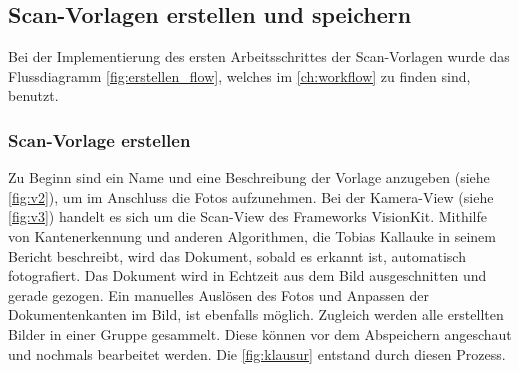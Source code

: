 \documentclass[notables, nomenclature, oneside, 150]{HSMW-Thesis}
\begin{document}
		\subsection{Scan-Vorlagen erstellen und speichern}
			Bei der Implementierung des ersten Arbeitsschrittes der Scan-Vorlagen wurde das Flussdiagramm \ref{fig:erstellen_flow}, welches im \autoref{ch:workflow} zu finden sind, benutzt.
			
			\subsubsection*{Scan-Vorlage erstellen}
				Zu Beginn sind ein Name und eine Beschreibung der Vorlage anzugeben (siehe \ref{fig:v2}), um im Anschluss die Fotos aufzunehmen. Bei der Kamera-View (siehe \ref{fig:v3}) handelt es sich um die Scan-View des Frameworks VisionKit. Mithilfe von Kantenerkennung und anderen Algorithmen, die Tobias Kallauke in seinem Bericht beschreibt, wird das Dokument, sobald es erkannt ist, automatisch fotografiert. Das Dokument wird in Echtzeit aus dem Bild ausgeschnitten und gerade gezogen. Ein manuelles Auslösen des Fotos und Anpassen der Dokumentenkanten im Bild, ist ebenfalls möglich. Zugleich werden alle erstellten Bilder in einer Gruppe gesammelt. Diese können vor dem Abspeichern angeschaut und nochmals bearbeitet werden. Die \autoref{fig:klausur} entstand durch diesen Prozess. 
\end{document}
